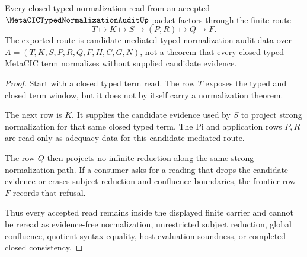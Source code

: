 \begin{theorem}
\label{thm:metacic-typed-normalization-audit-substitution-route}
Every closed typed normalization read from an accepted $\MetaCICTypedNormalizationAuditUp$ packet factors through the finite route
$$
T \longmapsto K \longmapsto S \longmapsto (P,R) \longmapsto Q \longmapsto F .
$$
The exported route is candidate-mediated typed-normalization audit data over $A=(T,K,S,P,R,Q,F,H,C,G,N)$, not a theorem that every closed typed MetaCIC term normalizes without supplied candidate evidence.
\end{theorem}
\begin{proof}
Start with a closed typed term read. The row $T$ exposes the typed and closed term window, but it does not by itself carry a normalization theorem.

The next row is $K$. It supplies the candidate evidence used by $S$ to project strong normalization for that same closed typed term. The Pi and application rows $P,R$ are read only as adequacy data for this candidate-mediated route.

The row $Q$ then projects no-infinite-reduction along the same strong-normalization path. If a consumer asks for a reading that drops the candidate evidence or erases subject-reduction and confluence boundaries, the frontier row $F$ records that refusal.

Thus every accepted read remains inside the displayed finite carrier and cannot be reread as evidence-free normalization, unrestricted subject reduction, global confluence, quotient syntax equality, host evaluation soundness, or completed closed consistency.
\end{proof}



